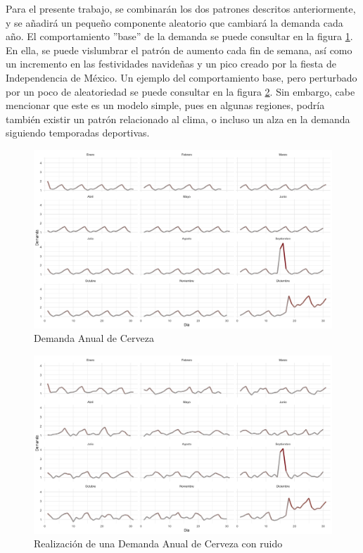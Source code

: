 Para el presente trabajo, se combinar\'an los dos patrones descritos anteriormente, y se a\~nadir\'a un peque\~no componente aleatorio que cambiar\'a la demanda cada a\~no. El comportamiento ''base'' de la demanda se puede consultar en la figura \ref{yearly_base}. En ella, se puede vislumbrar el patr\'on de aumento cada fin de semana, as\'i como un incremento en las festividades navide\~nas y un pico creado por la fiesta de Independencia de M\'exico. Un ejemplo del comportamiento base, pero perturbado por un poco de aleatoriedad se puede consultar en la figura \ref{yearly_base_noisy}. Sin embargo, cabe mencionar que este es un modelo simple, pues en algunas regiones, podr\'ia tambi\'en existir un patr\'on relacionado al clima, o incluso un alza en la demanda siguiendo temporadas deportivas. \\

\begin{figure}[ht!]
\caption{Demanda Anual de Cerveza}
\label{yearly_base}
\includegraphics[width=13cm]{tesis_tex/figs/monthly_demand_ggplot.png}
\centering
\end{figure}

\begin{figure}[ht!]
\caption{Realizaci\'on de una Demanda Anual de Cerveza con ruido }
\label{yearly_base_noisy}
\includegraphics[width=13cm]{tesis_tex/figs/monthly_demand_with_noise_ggplot.png}
\centering
\end{figure}


